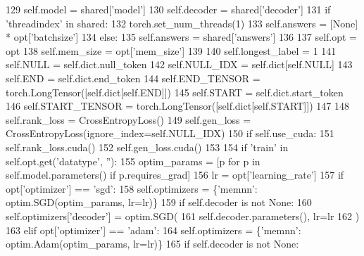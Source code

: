 \begin{DoxyCode}
129             self.model = shared[\textcolor{stringliteral}{'model'}]
130             self.decoder = shared[\textcolor{stringliteral}{'decoder'}]
131             \textcolor{keywordflow}{if} \textcolor{stringliteral}{'threadindex'} \textcolor{keywordflow}{in} shared:
132                 torch.set\_num\_threads(1)
133                 self.answers = [\textcolor{keywordtype}{None}] * opt[\textcolor{stringliteral}{'batchsize'}]
134             \textcolor{keywordflow}{else}:
135                 self.answers = shared[\textcolor{stringliteral}{'answers'}]
136 
137         self.opt = opt
138         self.mem\_size = opt[\textcolor{stringliteral}{'mem\_size'}]
139 
140         self.longest\_label = 1
141         self.NULL = self.dict.null\_token
142         self.NULL\_IDX = self.dict[self.NULL]
143         self.END = self.dict.end\_token
144         self.END\_TENSOR = torch.LongTensor([self.dict[self.END]])
145         self.START = self.dict.start\_token
146         self.START\_TENSOR = torch.LongTensor([self.dict[self.START]])
147 
148         self.rank\_loss = CrossEntropyLoss()
149         self.gen\_loss = CrossEntropyLoss(ignore\_index=self.NULL\_IDX)
150         \textcolor{keywordflow}{if} self.use\_cuda:
151             self.rank\_loss.cuda()
152             self.gen\_loss.cuda()
153 
154         \textcolor{keywordflow}{if} \textcolor{stringliteral}{'train'} \textcolor{keywordflow}{in} self.opt.get(\textcolor{stringliteral}{'datatype'}, \textcolor{stringliteral}{''}):
155             optim\_params = [p \textcolor{keywordflow}{for} p \textcolor{keywordflow}{in} self.model.parameters() \textcolor{keywordflow}{if} p.requires\_grad]
156             lr = opt[\textcolor{stringliteral}{'learning\_rate'}]
157             \textcolor{keywordflow}{if} opt[\textcolor{stringliteral}{'optimizer'}] == \textcolor{stringliteral}{'sgd'}:
158                 self.optimizers = \{\textcolor{stringliteral}{'memnn'}: optim.SGD(optim\_params, lr=lr)\}
159                 \textcolor{keywordflow}{if} self.decoder \textcolor{keywordflow}{is} \textcolor{keywordflow}{not} \textcolor{keywordtype}{None}:
160                     self.optimizers[\textcolor{stringliteral}{'decoder'}] = optim.SGD(
161                         self.decoder.parameters(), lr=lr
162                     )
163             \textcolor{keywordflow}{elif} opt[\textcolor{stringliteral}{'optimizer'}] == \textcolor{stringliteral}{'adam'}:
164                 self.optimizers = \{\textcolor{stringliteral}{'memnn'}: optim.Adam(optim\_params, lr=lr)\}
165                 \textcolor{keywordflow}{if} self.decoder \textcolor{keywordflow}{is} \textcolor{keywordflow}{not} \textcolor{keywordtype}{None}:

\end{DoxyCode}
